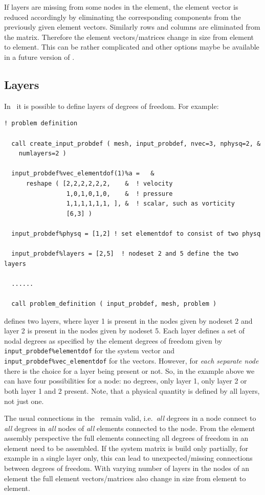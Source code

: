 If layers are missing from some nodes in the element, the element vector
is reduced accordingly by eliminating the corresponding components from the
previously given element vectors. Similarly rows and columns are eliminated
from the matrix. Therefore the element vectors/matrices change in size from
element to element. This can be rather complicated and other options maybe be
available in a future version of \tfem.

\subsection{Layers}
\label{sec:layers}

In \tfem\ it is possible to define layers of degrees of freedom. For example:
\begin{verbatim}
! problem definition

  call create_input_probdef ( mesh, input_probdef, nvec=3, nphysq=2, &
    numlayers=2 )

  input_probdef%vec_elementdof(1)%a =   &
      reshape ( [2,2,2,2,2,2,    &  ! velocity
                 1,0,1,0,1,0,    &  ! pressure
                 1,1,1,1,1,1, ], &  ! scalar, such as vorticity
                 [6,3] )

  input_probdef%physq = [1,2] ! set elementdof to consist of two physq

  input_probdef%layers = [2,5]  ! nodeset 2 and 5 define the two layers

  ......

  call problem_definition ( input_probdef, mesh, problem )

\end{verbatim}
defines two layers, where layer 1 is present in the nodes given by
nodeset 2 and layer 2 is present in the nodes given by nodeset 5. Each layer
defines a set of nodal degrees as specified by the
element degrees of freedom given by 
\texttt{input\_probdef\%elementdof} for the system vector and
\texttt{input\_probdef\%vec\_elementdof} for the vectors. However, for
\emph{each separate node} there is the choice for a layer being present or
not. So, in the example above we can have four possibilities for a node: no
degrees, only layer 1, only layer 2 or both layer 1 and 2 present. Note, that
a physical quantity is defined by all layers, not just one. 

The usual connections in the \fem\ remain valid, i.e.\ \emph{all} degrees in
a node connect to \emph{all} degrees in \emph{all} nodes of \emph{all}
elements connected to the node. From the element assembly perspective
the full elements connecting all degrees of freedom in an element need to be
assembled.
If the system matrix is build only partially, for example
in a single layer only, this can lead to unexpected/missing
connections between degrees of freedom.
With varying number of layers in the nodes of an element 
the full element vectors/matrices also change in size from
element to element.


